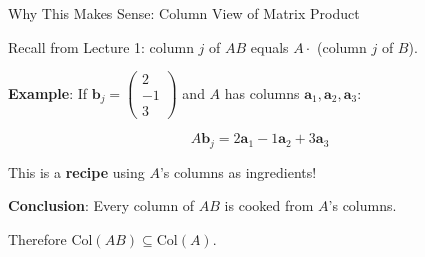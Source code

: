 \documentclass[10pt]{beamer}
\theoremstyle{definition}
\newcommand{\x}[1]{\alert{\textbf{#1}}}
\begin{document}
\begin{frame}{Why This Makes Sense: Column View of Matrix Product}

Recall from Lecture 1: column $j$ of $AB$ equals $A \cdot$ (column $j$ of $B$).

\vspace{1em}

\x{Example}: If $\mathbf{b}_j = \begin{pmatrix} 2 \\ -1 \\ 3 \end{pmatrix}$ and $A$ has columns $\mathbf{a}_1, \mathbf{a}_2, \mathbf{a}_3$:

$$A\mathbf{b}_j = 2\mathbf{a}_1 - 1\mathbf{a}_2 + 3\mathbf{a}_3$$

\vspace{1em}

This is a \x{recipe} using $A$'s columns as ingredients!

\vspace{1em}

\x{Conclusion}: Every column of $AB$ is cooked from $A$'s columns.

Therefore $\text{Col}(AB) \subseteq \text{Col}(A)$.

\end{frame}
\end{document}
